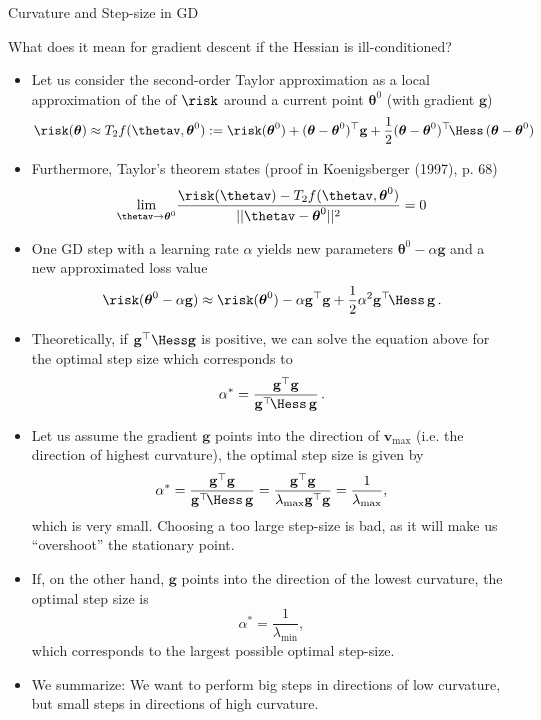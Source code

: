 \begin{vbframe}{Curvature and Step-size in GD}

What does it mean for gradient descent if the Hessian is ill-conditioned?

 \begin{itemize}
 \item Let us consider the second-order Taylor approximation as a local approximation of the of $\risk$ around a current point $\boldsymbol{\theta}^0$ (with gradient $\mathbf{g}$)
    \begin{equation*}
    \risk(\boldsymbol{\theta}) \approx T_2f(\thetav, \boldsymbol{\theta}^0) := \risk(\boldsymbol{\theta}^0) + (\boldsymbol{\theta}-\boldsymbol{\theta}^0)^\top \mathbf{g} + \frac{1}{2}(\boldsymbol{\theta}-\boldsymbol{\theta}^0)^\top \!\Hess\, (\boldsymbol{\theta}-\boldsymbol{\theta}^0)
    \end{equation*}
  \item Furthermore, Taylor's theorem states (proof in Koenigsberger (1997), p. 68)
    \begin{equation*}
     \underset{\thetav \rightarrow \boldsymbol{\theta}^0}{\lim} \frac{\risk(\thetav) - T_2f(\thetav, \boldsymbol{\theta}^0)}{||\thetav-\boldsymbol{\theta}^0||^2} = 0
   \end{equation*}

  \framebreak 

  \item One GD step with a learning rate $\alpha$ yields new parameters $\boldsymbol{\theta}^0-\alpha \mathbf{g}$ and a new approximated loss value
   $$
   \risk(\boldsymbol{\theta}^0-\alpha \mathbf{g}) \approx \risk(\boldsymbol{\theta}^0) - \alpha \mathbf{g}^\top\mathbf{g} + \frac{1}{2}	\alpha^2 \mathbf{g}^\top\!\Hess\,\mathbf{g}  \,.
   $$ 
 
 \item Theoretically, if $\mathbf{g}^\top \Hess \mathbf{g}$ is positive, we can solve the equation above for the optimal step size which corresponds to 
 $$
 \alpha^* = \frac{\mathbf{g}^\top \mathbf{g}}{\mathbf{g}^\top \!\Hess\, \mathbf{g}}  \,.
 $$
 
 \framebreak 

 \item Let us assume the gradient $\mathbf{g}$ points into the direction of $\bm{v}_{\text{max}}$ (i.e. the direction of highest curvature), the optimal step size is given by 
  $$
  \alpha^* = \frac{\mathbf{g}^\top \mathbf{g}}{\mathbf{g}^\top \!\Hess\, \mathbf{g}} = \frac{\mathbf{g}^\top \mathbf{g}}{\lambda_{\text{max}} \mathbf{g}^\top   \mathbf{g}} = \frac{1}{\lambda_{\text{max}}}, 
  $$ 
  which is very small. Choosing a too large step-size is bad, as it will make us \enquote{overshoot} the stationary point.
  \item If, on the other hand, $\mathbf{g}$ points into the direction of the lowest curvature, the optimal step size is 
  $$
  \alpha^* = \frac{1}{\lambda_{\text{min}}}, 
  $$
  which corresponds to the largest possible optimal step-size.
  \item We summarize: We want to perform big steps in directions of low curvature, but small steps in directions of high curvature.


\end{itemize}
\end{vbframe}
